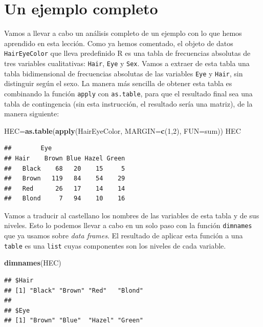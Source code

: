 \documentclass[]{book}
\newenvironment{Shaded}{\begin{snugshade}}{\end{snugshade}}
\newcommand{\DataTypeTok}[1]{\textcolor[rgb]{0.13,0.29,0.53}{#1}}
\newcommand{\DecValTok}[1]{\textcolor[rgb]{0.00,0.00,0.81}{#1}}
\newcommand{\KeywordTok}[1]{\textcolor[rgb]{0.13,0.29,0.53}{\textbf{#1}}}
\newcommand{\NormalTok}[1]{#1}
\theoremstyle{definition}
\theoremstyle{definition}
\theoremstyle{definition}
\theoremstyle{remark}
\begin{document}
\hypertarget{sec:exqual}{%
\section{Un ejemplo completo}\label{sec:exqual}}

Vamos a llevar a cabo un análisis completo de un ejemplo con lo que hemos aprendido en esta lección. Como ya hemos comentado, el objeto de datos \texttt{HairEyeColor} que lleva predefinido R es una tabla de frecuencias absolutas de tres variables cualitativas: \texttt{Hair}, \texttt{Eye} y \texttt{Sex}. Vamos a extraer de esta tabla una tabla bidimensional de frecuencias absolutas de las variables \texttt{Eye} y \texttt{Hair}, sin distinguir según el sexo. La manera más sencilla de obtener esta tabla es combinando la función \texttt{apply} con \texttt{as.table}, para que el resultado final sea una tabla de contingencia (sin esta instrucción, el resultado sería una matriz), de la manera siguiente:

\begin{Shaded}
\begin{Highlighting}[]
\NormalTok{HEC=}\KeywordTok{as.table}\NormalTok{(}\KeywordTok{apply}\NormalTok{(HairEyeColor, }\DataTypeTok{MARGIN=}\KeywordTok{c}\NormalTok{(}\DecValTok{1}\NormalTok{,}\DecValTok{2}\NormalTok{), }\DataTypeTok{FUN=}\NormalTok{sum))}
\NormalTok{HEC}
\end{Highlighting}
\end{Shaded}

\begin{verbatim}
##        Eye
## Hair    Brown Blue Hazel Green
##   Black    68   20    15     5
##   Brown   119   84    54    29
##   Red      26   17    14    14
##   Blond     7   94    10    16
\end{verbatim}

Vamos a traducir al castellano los nombres de las variables de esta tabla y de sus niveles. Esto lo podemos llevar a cabo en un solo paso con la función \texttt{dimnames} que ya usamos sobre \emph{data frames}.
El resultado de aplicar esta función a una \texttt{table} es una \texttt{list} cuyas componentes son los niveles de cada variable.

\begin{Shaded}
\begin{Highlighting}[]
\KeywordTok{dimnames}\NormalTok{(HEC)}
\end{Highlighting}
\end{Shaded}

\begin{verbatim}
## $Hair
## [1] "Black" "Brown" "Red"   "Blond"
## 
## $Eye
## [1] "Brown" "Blue"  "Hazel" "Green"
\end{verbatim}
\end{document}
